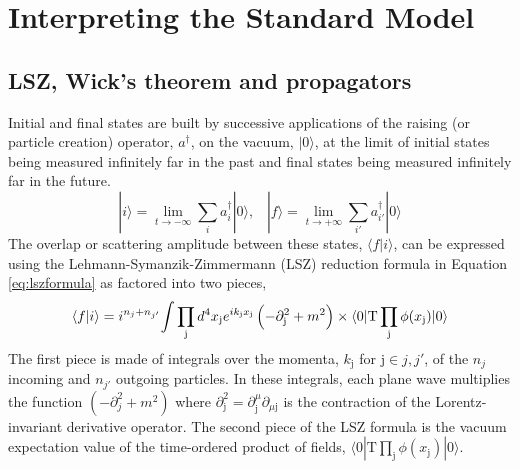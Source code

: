 \section{Interpreting the Standard Model}
\subsection{LSZ, Wick's theorem and propagators}
 Initial and final states %
  are built by successive applications
  of the raising (or particle creation) operator, $a^\dagger$,
  on the vacuum, $|0\rangle$, at the limit of initial states being
  measured infinitely far in the past and 
  final states being measured infinitely far in the future.
\begin{equation}
 |i\rangle = \lim_{t\rightarrow -\infty}  \sum_i a_i^\dagger |0\rangle, \;\;\;
 |f\rangle = \lim_{t\rightarrow +\infty}  \sum_{i'} a_{i'}^\dagger |0\rangle
\end{equation}
 The overlap or scattering amplitude between these states,
  $\langle f | i \rangle$,
  can be expressed using the Lehmann-Symanzik-Zimmermann (LSZ)
  reduction formula in Equation \ref{eq:lszformula}
  as factored into two pieces,
\begin{equation}\label{eq:lszformula}
 \langle f | i \rangle = i^{n_j + n_{j'}} {\Large \int}
   \prod_{\mathrm{j}} d^4 x_{\mathrm{j}}
   e^{ik_{\mathrm{j}} x_{\mathrm{j}} }
   \left(-\partial^2_{\mathrm{j}} + m^2 \right)
 \times
\langle 0 | \mathrm{T}\prod_{\mathrm{j}} \phi(x_{\mathrm{j}}) | 0 \rangle
\end{equation}
 The first piece is made of integrals over the
  momenta, $k_{\mathrm{j}}$ for $\mathrm{j}\in j,j'$,
  of the $n_j$ incoming and 
  $n_{j'}$ outgoing particles.
 In these integrals, each plane wave
  multiplies the function $(-\partial^2_j + m^2)$ 
  where $\partial^2_{\mathrm{j}} = \partial^\mu_{\mathrm{j}}\partial_{\mu\mathrm{j}}$
  is the contraction of the Lorentz-invariant derivative operator.
 The second piece of the LSZ formula is the 
  vacuum expectation value of the time-ordered
  product of fields, $\langle 0 |
   \mathrm{T} \prod_\mathrm{j} \phi(x_\mathrm{j}) |
   0 \rangle$.

